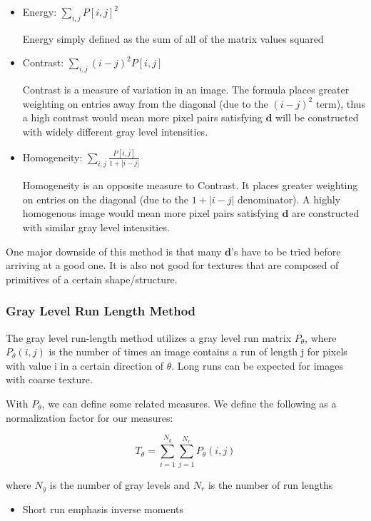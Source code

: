 \documentclass{article}
\begin{document}
\begin{multicols}{2}
\begin{itemize}
\item Energy:  $\sum_{i,j} P[i,j]^2$

Energy simply defined as the sum of all of the matrix values squared

\item Contrast: $\sum_{i,j} (i-j)^2 P[i,j]$

Contrast is a measure of variation in an image. The formula places greater weighting on entries away from the diagonal (due to the $(i-j)^2$ term), thus a high contrast would mean more pixel pairs satisfying $\mathbf{d}$ will be constructed with widely different gray level intensities.

\item Homogeneity: $\sum_{i,j} \frac{P[i,j]}{ 1 + | i-j |}$

Homogeneity is an opposite measure to Contrast. It places greater weighting on entries on the diagonal (due to the $1 + |i - j|$ denominator). A highly homogenous image would mean more pixel pairs satisfying $\mathbf{d}$ are constructed with similar gray level intensities.

\end{itemize}

One major downside of this method is that many $\mathbf{d}$'s have to be tried before arriving at a good one. It is also not good for textures that are composed of primitives of a certain shape/structure.

\subsubsection{Gray Level Run Length Method}

The gray level run-length method utilizes a gray level run matrix $P_\theta$, where $P_\theta(i,j)$ is the number of times an image contains a run of length j for pixels with value i in a certain direction of $\theta$. Long runs can be expected for images with coarse texture.

With $P_\theta$, we can define some related measures. We define the following as a normalization factor for our measures:

$$
T_\theta = \sum_{i=1} ^{N_g} \sum_{j=1} ^{N_r} P_\theta(i,j)
$$

where $N_g$ is the number of gray levels and $N_r$ is the number of run lengths

\begin{itemize}
\item {Short run emphasis inverse moments}


\end{itemize}
\end{multicols}
\end{document}
